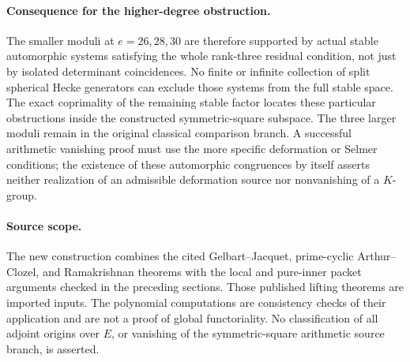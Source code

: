 \paragraph{Consequence for the higher-degree obstruction.}
The smaller moduli at $e=26,28,30$ are therefore supported by
actual stable automorphic systems satisfying the whole
rank-three residual condition, not just by isolated
determinant coincidences.  No finite or infinite collection
of split spherical Hecke generators can exclude those
systems from the full stable space.  The exact coprimality
of the remaining stable factor locates these particular
obstructions inside the constructed symmetric-square
subspace.  The three larger moduli remain in the original
classical comparison branch.  A successful arithmetic
vanishing proof must use the more specific deformation or
Selmer conditions; the existence of these automorphic
congruences by itself asserts neither realization of an
admissible deformation source nor nonvanishing of a
$K$-group.

\paragraph{Source scope.}
The new construction combines the cited Gelbart--Jacquet,
prime-cyclic Arthur--Clozel, and Ramakrishnan theorems with
the local and pure-inner packet arguments checked in the
preceding sections.  Those published lifting theorems are
imported inputs.  The polynomial computations are consistency
checks of their application and are not a proof of global
functoriality.  No classification of all adjoint origins over
$E$, or vanishing of the symmetric-square arithmetic source
branch, is asserted.
